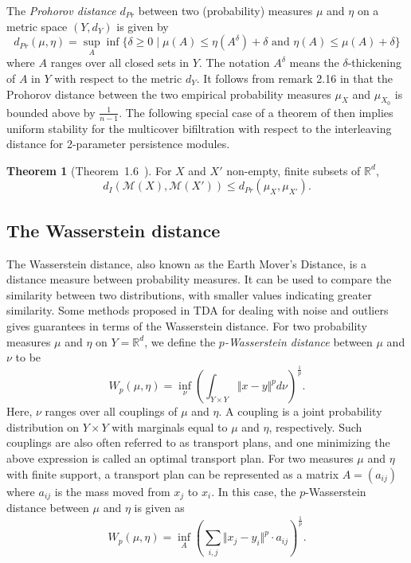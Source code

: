 \documentclass[10pt,a4paper]{article}
\theoremstyle{definition}
\newtheorem{thm}{Theorem}[section]
\newcommand{\R}{\mathbb{R}}
\begin{document}
The \textit{Prohorov distance} $d_{Pr}$ between two (probability) measures $\mu$ and $\eta$ on a metric space $(Y,d_Y)$ is given by
$$
d_{Pr}(\mu, \eta) = \sup_A\inf\{\delta\geq0\mid\mu(A)\leq\eta(A^\delta)+\delta\text{ and } \eta(A)\leq\mu(A)+\delta\}
$$
where $A$ ranges over all closed sets in $Y$. The notation $A^\delta$ means the $\delta$-thickening of $A$ in $Y$ with respect to the metric $d_Y$. It follows from remark 2.16 in \cite{Blumberg2020} that the Prohorov distance between the two empirical probability measures $\mu_X$ and $\mu_{X_0}$ is bounded above by $\frac{1}{n-1}$. The following special case of a theorem of \cite{Blumberg2020} then implies uniform stability for the multicover bifiltration with respect to the interleaving distance for 2-parameter persistence modules.

\begin{thm}[Theorem~1.6~\cite{Blumberg2020}]
For $X$ and $X'$ non-empty, finite subsets of $\mathbb{R}^d$,
$$
d_I(\mathcal{M}(X), \mathcal{M}(X'))\leq d_{Pr}(\mu_X, \mu_{X'}).
$$
\end{thm}


\subsection{The Wasserstein distance}
The Wasserstein distance, also known as the Earth Mover's Distance, is a distance measure between probability measures. It can be used to compare the similarity between two distributions, with smaller values indicating greater similarity. Some methods proposed in TDA for dealing with noise and outliers gives guarantees in terms of the Wasserstein distance. For two probability measures $\mu$ and $\eta$ on $Y=\R^d$, we define the \textit{$p$-Wasserstein distance} between $\mu$ and $\nu$ to be
$$
W_p(\mu, \eta) = \inf_{\nu}\left(\int_{Y\times Y}\Vert x-y\Vert^p d\nu\right)^{\frac{1}{p}}.
$$
Here, $\nu$ ranges over all couplings of $\mu$ and $\eta$. A coupling is a joint probability distribution on $Y\times Y$ with marginals equal to $\mu$ and $\eta$, respectively. Such couplings are also often referred to as transport plans, and one minimizing the above expression is called an optimal transport plan. For two measures $\mu$ and $\eta$ with finite support, a transport plan can be represented as a matrix $A=(a_{ij})$ where $a_{ij}$ is the mass moved from $x_j$ to $x_i$. In this case, the $p$-Wasserstein distance between $\mu$ and $\eta$ is given as
$$
W_p(\mu, \eta) = \inf_A \left(\sum_{i,j}\Vert x_j - y_i\Vert^p\cdot a_{ij}\right)^{\frac{1}{p}}.
$$
\end{document}
